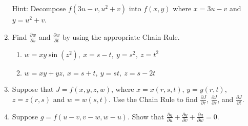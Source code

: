 \documentclass[12pt]{article}
\newif\ifans
\begin{document}
\begin{enumerate}
Hint: Decompose $f(3u-v,u^2+v)$ into $f(x,y)$ where $x=3u-v$ and $y=u^2+v$.

\ifans{\fbox{$g_u(2,-1)=11$; $g_v(2,-1)=8$}} \fi

\item Find $\frac{\partial w}{\partial s}$ and $\frac{\partial w}{\partial t}$ by using the appropriate Chain Rule. 

\begin{enumerate}

\item $w=xy\sin{\left(z^2\right)},\ x=s-t,\ y=s^2,\ z=t^2$ 

\ifans{\fbox{$\frac{\partial w}{\partial s}=s^2\sin{\left(t^4\right)}+2s(s-t)\sin{\left(t^4\right)}$; $\frac{\partial w}{\partial t}=-s^2\sin{\left(t^4\right)}+4s^2t^3(s-t)\cos{\left(t^4\right)}$}} \fi

\item $w=xy+yz,\ x=s+t,\ y=st,\ z=s-2t$ 

\ifans{\fbox{$\frac{\partial w}{\partial s}=4st-t^2$; $\frac{\partial w}{\partial t}=2s^2-2st$}} \fi

\end{enumerate}

\item Suppose that $J=f(x,y,z,w)$, where $x=x(r,s,t)$, $y=y(r,t)$, $z=z(r,s)$ and $w=w(s,t)$.  Use the Chain Rule to find $\frac{\partial J}{\partial r}$, $\frac{\partial J}{\partial s}$, and $\frac{\partial J}{\partial t}$.

\ifans{\fbox{\parbox{0.4\linewidth}{$\frac{\partial J}{\partial r}=\frac{\partial f}{\partial x}\frac{\partial x}{\partial r}+\frac{\partial f}{\partial y}\frac{\partial y}{\partial r}+\frac{\partial f}{\partial z}\frac{\partial z}{\partial r}$; \\
\\
$\frac{\partial J}{\partial s}=\frac{\partial f}{\partial x}\frac{\partial x}{\partial s}+\frac{\partial f}{\partial z}\frac{\partial z}{\partial s}+\frac{\partial f}{\partial w}\frac{\partial w}{\partial s}$;\\
\\
$\frac{\partial J}{\partial t}=\frac{\partial f}{\partial x}\frac{\partial x}{\partial t}+\frac{\partial f}{\partial y}\frac{\partial y}{\partial t}+\frac{\partial f}{\partial w}\frac{\partial w}{\partial t}$
}}} \fi

\newpage

\item Suppose $g=f(u-v,v-w,w-u)$.  Show that $\frac{\partial g}{\partial u}+\frac{\partial g}{\partial v}+\frac{\partial g}{\partial w}=0$.


\end{enumerate}
\end{document}
